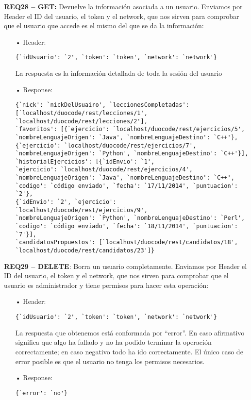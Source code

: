 \textbf{REQ28 – GET:} Devuelve la información asociada a un usuario. Enviamos por Header el ID del usuario, el token y el network, que nos sirven para comprobar que el usuario que accede es el mismo del que se da la información:
\begin{itemize}
\item[•]
Header: 
{\codesize
\begin{verbatim}
{`idUsuario': `2', `token': `token', `network': `network'}
\end{verbatim}
}

La respuesta es la información detallada de toda la sesión del usuario
\item[•]
Response: 
{\codesize
\begin{verbatim}
{`nick': `nickDelUsuairo', `leccionesCompletadas': 
[`localhost/duocode/rest/lecciones/1', `localhost/duocode/rest/lecciones/2'], 
`favoritos': [{`ejercicio': `localhost/duocode/rest/ejercicios/5', 
`nombreLenguajeOrigen': `Java', `nombreLenguajeDestino': `C++'}, 
{`ejercicio': `localhost/duocode/rest/ejercicios/7', 
`nombreLenguajeOrigen': `Python', `nombreLenguajeDestino': `C++'}], 
`historialEjercicios': [{`idEnvio': `1', 
`ejercicio': `localhost/duocode/rest/ejercicios/4', 
`nombreLenguajeOrigen': `Java', `nombreLenguajeDestino': `C++', 
`codigo': `código enviado', `fecha': `17/11/2014', `puntuacion': `2'}, 
{`idEnvio': `2', `ejercicio': `localhost/duocode/rest/ejercicios/9', 
`nombreLenguajeOrigen': `Python', `nombreLenguajeDestino': `Perl', 
`codigo': `código enviado', `fecha': `18/11/2014', `puntuacion': `7'}], 
`candidatosPropuestos': [`localhost/duocode/rest/candidatos/18', 
`localhost/duocode/rest/candidatos/23']}
\end{verbatim}
}
\end{itemize}

\textbf{REQ29 – DELETE}: Borra un usuario completamente.
Enviamos por Header el ID del usuario, el token y el network, que nos sirven para comprobar que el usuario es administrador y tiene permisos para hacer esta operación:
\begin{itemize}
\item[•]
Header: 
{\codesize
\begin{verbatim}
{`idUsuario': `2', `token': `token', `network': `network'}
\end{verbatim}
}

La respuesta que obtenemos está conformada por ``error''. En caso afirmativo significa que algo ha fallado y no ha podido terminar la operación correctamente; en caso negativo todo ha ido correctamente. El único caso de error posible es que el usuario no tenga los permisos necesarios.
\item[•]
Response: 
{\codesize
\begin{verbatim}
{`error': `no'}
\end{verbatim}
}
\end{itemize}

